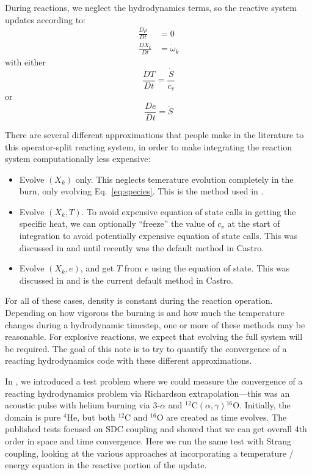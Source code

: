 \documentclass[times,preprint]{aastex63}
\newcommand{\castro}{{\sf Castro}}
\newcommand{\isotm}[2]{{}^{#2}\mathrm{#1}}
\newcommand{\omegadot}{\dot{\omega}}
\newcommand{\Sdot}{\dot{S}}
\newcommand{\MarginPar}[1]{\marginpar{\vskip-\baselineskip\raggedright\tiny\sffamily\hrule\smallskip{\color{red}#1}\par\smallskip\hrule}}
\begin{document}
During reactions, we neglect the hydrodynamics terms,
so the reactive system updates according to:
\begin{align}
\frac{D\rho}{Dt} &= 0 \\
\frac{DX_k}{Dt} &= \omegadot_k \label{eq:species}
\end{align}
with either
\begin{equation}
\frac{DT}{Dt} = \frac{\Sdot}{c_v}
\end{equation}
or
\begin{equation}
\frac{De}{Dt} = \Sdot
\end{equation}

There are several different approximations that people make in the
literature to this operator-split reacting system, in order to make
integrating the reaction system computationally less expensive:
\begin{itemize}
\item Evolve $(X_k)$ only.  This neglects temerature evolution
  completely in the burn, only evolving Eq.~\ref{eq:species}.  This is
  the method used in \citet{flash}. \MarginPar{other codes?}

\item Evolve $(X_k, T)$.  To avoid expensive equation of state calls
  in getting the specific heat, we can optionally ``freeze'' the value
  of $c_v$ at the start of integration to avoid potentially expensive
  equation of state calls.  This was discussed in \cite{Bell:2004} and
  until recently was the default method in \castro.

\item Evolve $(X_k, e)$, and get $T$ from $e$ using the equation of
  state.  This was discussed in \citet{fma} and is the current default
  method in \castro.
\end{itemize}
For all of these cases, density is constant during the reaction operation.
Depending on how vigorous the burning is and how much the temperature
changes during a hydrodynamic timestep, one or more of these
methods may be reasonable.  For explosive reactions, we expect
that evolving the full system will be required.  The goal of this
note is to try to quantify the convergence of a reacting hydrodynamics
code with these different approximations.

In \citet{castro_sdc}, we introduced a test problem where we could
measure the convergence of a reacting hydrodynamics problem via
Richardson extrapolation---this was an acoustic pulse with helium
burning via $3$-$\alpha$ and
$\isotm{C}{12}(\alpha,\gamma)\isotm{O}{16}$.  Initially, the domain is
pure $\isotm{He}{4}$, but both $\isotm{C}{12}$ and $\isotm{O}{16}$ are
created as time evolves.  The published tests focused on SDC coupling
and showed that we can get overall 4th order in space and time
convergence.  Here we run the same test with Strang coupling, looking
at the various approaches at incorporating a temperature / energy equation in
the reactive portion of the update.
\end{document}
